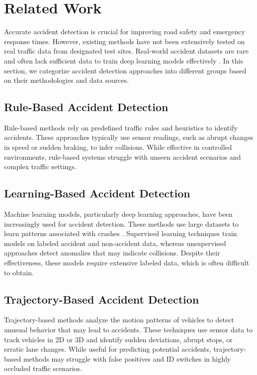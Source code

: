 \section{Related Work}
Accurate accident detection is crucial for improving road safety and emergency response times. However, existing methods have not been extensively tested on real traffic data from designated test sites. Real-world accident datasets \cite{xu2022tad} are rare and often lack sufficient data to train deep learning models effectively \cite{liu2024survey}. In this section, we categorize accident detection approaches into different groups based on their methodologies and data sources.

\subsection{Rule-Based Accident Detection}
Rule-based methods \cite{pirdavani_application_2015} rely on predefined traffic rules and heuristics to identify accidents. These approaches typically use sensor readings, such as abrupt changes in speed or sudden braking, to infer collisions. While effective in controlled environments, rule-based systems struggle with unseen accident scenarios and complex traffic settings.

\subsection{Learning-Based Accident Detection}
Machine learning models, particularly deep learning approaches, have been increasingly used for accident detection. These methods use large datasets to learn patterns associated with crashes \cite{zahid2024datadriven, adewopo2024smart}. Supervised learning techniques train models on labeled accident and non-accident data, whereas unsupervised approaches \cite{yao2023dota} detect anomalies that may indicate collisions. Despite their effectiveness, these models require extensive labeled data, which is often difficult to obtain.

\subsection{Trajectory-Based Accident Detection}
Trajectory-based methods \cite{yang_freeway_2021} analyze the motion patterns of vehicles to detect unusual behavior that may lead to accidents. These techniques use sensor data to track vehicles in 2D or 3D and identify sudden deviations, abrupt stops, or erratic lane changes. While useful for predicting potential accidents, trajectory-based methods may struggle with false positives and ID switches in highly occluded traffic scenarios.

